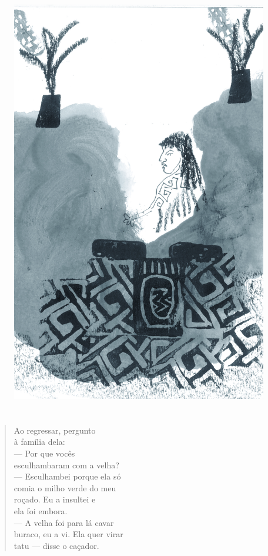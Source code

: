 \pagebreak
\thispagestyle{empty}
\begin{figure}
\vspace*{-1.6cm}
\hspace*{-2.2cm}\includegraphics[width=138mm]{./imgs/img8.jpg}
\end{figure}

\chapter*{}

\mbox{}\vspace*{\fill}

\begin{verse}
Ao regressar, pergunto\\
à família dela:\\
— Por que vocês\\
esculhambaram com a velha?\\
— Esculhambei porque ela só\\
comia o milho verde do meu\\
roçado. Eu a insultei e\\
ela foi embora.\\
— A velha foi para lá cavar\\
buraco, eu a vi. Ela quer virar\\
tatu — disse o caçador.
\end{verse}

